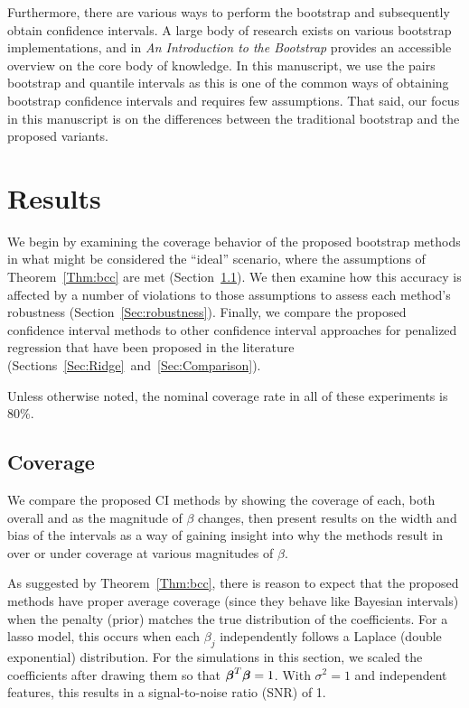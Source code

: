 Furthermore, there are various ways to perform the bootstrap and subsequently obtain confidence intervals. A large body of research exists on various bootstrap implementations, and \cite{Efron1994} in \textit{An Introduction to the Bootstrap} provides an accessible overview on the core body of knowledge. In this manuscript, we use the pairs bootstrap and quantile intervals as this is one of the common ways of obtaining bootstrap confidence intervals and requires few assumptions. That said, our focus in this manuscript is on the differences between the traditional bootstrap and the proposed variants.

\section{Results}
\label{Sec:results}

We begin by examining the coverage behavior of the proposed bootstrap methods in what might be considered the ``ideal'' scenario, where the assumptions of Theorem~\ref{Thm:bcc} are met (Section~\ref{Sec:Coverage}). We then examine how this accuracy is affected by a number of violations to those assumptions to assess each method's robustness (Section~\ref{Sec:robustness}). Finally, we compare the proposed confidence interval methods to other confidence interval approaches for penalized regression that have been proposed in the literature (Sections~\ref{Sec:Ridge}~and~\ref{Sec:Comparison}).

Unless otherwise noted, the nominal coverage rate in all of these experiments is 80\%.

\subsection{Coverage}\label{Sec:Coverage}

We compare the proposed CI methods by showing the coverage of each, both overall and as the magnitude of $\beta$ changes, then present results on the width and bias of the intervals as a way of gaining insight into why the methods result in over or under coverage at various magnitudes of $\beta$.

As suggested by Theorem~\ref{Thm:bcc}, there is reason to expect that the proposed methods have proper average coverage (since they behave like Bayesian intervals) when the penalty (prior) matches the true distribution of the coefficients. For a lasso model, this occurs when each $\beta_j$ independently follows a Laplace (double exponential) distribution. For the simulations in this section, we scaled the coefficients after drawing them so that $\boldsymbol{\beta}^T\boldsymbol{\beta} = 1$. With $\sigma^2=1$ and independent features, this results in a signal-to-noise ratio (SNR) of 1.

